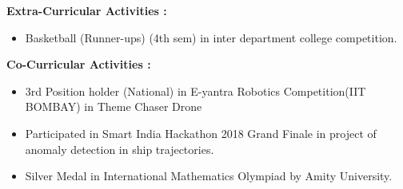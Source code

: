 \documentclass[11pt,a4paper]{article}
\begin{document}
\begin{multicols}{2}
	\begin{minipage}{0.15\paperwidth}
		\textbf{Extra-Curricular\linebreak
		Activities :}
	\end{minipage}
	\begin{minipage}{0.7\paperwidth}
		\begin{itemize}
			\item Basketball (Runner-ups) (4th sem) in inter department college competition.
		\end{itemize}
	\end{minipage}
\end{multicols}
\hfill
\begin{multicols}{2}
	\begin{minipage}{0.15\paperwidth}
		\textbf{Co-Curricular\linebreak
			Activities :}
	\end{minipage}
	\begin{minipage}{0.7\paperwidth}
		\begin{itemize}
			\item 3rd Position holder (National) in E-yantra Robotics Competition(IIT BOMBAY) in Theme Chaser Drone
			\item Participated in Smart India Hackathon 2018 Grand Finale in project of anomaly detection in ship trajectories.
			\item Silver Medal in International Mathematics Olympiad by Amity University.
		\end{itemize}
	\end{minipage}
\end{multicols}
\end{document}
